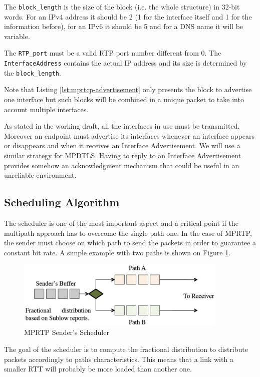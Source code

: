 The \texttt{block\_length} is the size of the block (i.e. the whole structure) in 32-bit words. For an IPv4 address it should be 2 (1 for the interface itself and 1 for the information before), for an IPv6 it should be 5 and for a DNS name it will be variable.

The \texttt{RTP\_port} must be a valid RTP port number different from 0. The \texttt{InterfaceAddress} contains the actual IP address and its size is determined by the \texttt{block\_length}.

Note that Listing \ref{lst:mprtcp-advertisement} only presents the block to advertise one interface but such blocks will be combined in a unique packet to take into account multiple interfaces.

As stated in the working draft, all the interfaces in use must be transmitted. Moreover an endpoint must advertise its interfaces whenever an interface appears or disappears and when it receives an Interface Advertisement. We will use a similar strategy for MPDTLS. Having to reply to an Interface Advertisement provides somehow an acknowledgment mechanism that could be useful in an unreliable environment.

\subsection{Scheduling Algorithm}

The scheduler is one of the most important aspect and a critical point if the multipath approach has to overcome the single path one. In the case of MPRTP, the sender must choose on which path to send the packets in order to guarantee a constant bit rate. A simple example with two paths is shown on Figure \ref{fig:mprtp-scheduler}.

\begin{figure}[!h]
\centering
\includegraphics[width=0.9\textwidth]{images/mprtp-scheduler}
\caption{MPRTP Sender's Scheduler}
\label{fig:mprtp-scheduler}
\end{figure}

The goal of the scheduler is to compute the fractional distribution to distribute packets accordingly to paths characteristics. This means that a link with a smaller RTT will probably be more loaded than another one.


